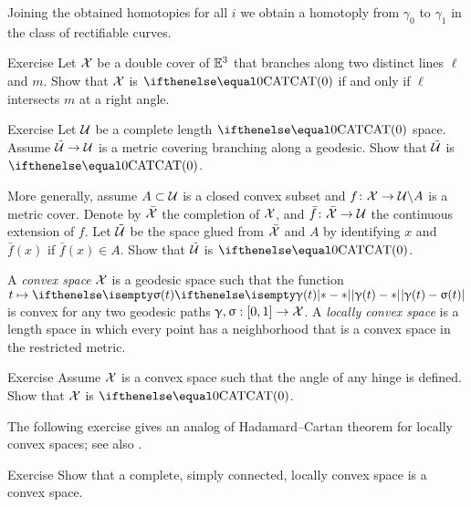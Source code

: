 Joining the obtained homotopies for all $i$ we obtain a homotoply from $\gamma_0$ to $\gamma_1$ in the class of rectifiable curves.
\qeds

\begin{thm}{Exercise}\label{ex:cover-branching-along-2-lines}
Let $\mathcal{X}$ be a double cover of $\mathbb{E}^3$ that branches along two distinct lines $\ell$ and $m$.
Show that  $\mathcal{X}$ is $\CAT0$ if and only if $\ell$ intersects $m$ at a right angle.
\end{thm}

\begin{thm}{Exercise}\label{ex:branching}
Let $\mathcal{U}$ be a complete length $\CAT0$ space.
Assume $\tilde{\spc{U}}\to \spc{U}$ is a metric covering branching along a geodesic.
Show that $\tilde{\mathcal{U}}$ is $\CAT0$.

More generally, assume $A\subset \spc{U}$ is a closed convex subset and $f\:\spc{X}\to \spc{U}\backslash A$ is a metric cover.
Denote by $\bar{\mathcal{X}}$ the completion of $\mathcal{X}$, and 
$\bar f\:\bar{\spc{X}}\to \spc{U}$ the continuous extension of $f$.
Let $\tilde{\mathcal{U}}$ be the space glued from $\bar{\mathcal{X}}$ and $A$ by identifying $x$ and $\bar f(x)$ if $\bar f(x)\in A$.
Show that $\tilde{\mathcal{U}}$ is $\CAT0$.
\end{thm}

A \emph{convex space} $\mathcal{X}$ is a geodesic space such that the function
$t\mapsto\dist{\gamma(t)}{\sigma(t)}{}$ is convex 
for any two  geodesic paths $\gamma,\sigma:[0,1]\to \spc{X}$.  
A \emph{locally convex space} is a length space in which every point has a neighborhood that is a convex space in the restricted metric.


\begin{thm}{Exercise}\label{ex:cats-cradle}
Assume $\mathcal{X}$ is a convex space 
such that the angle of any hinge is defined.
Show that $\mathcal{X}$ is $\CAT{0}$.
\end{thm}

The following exercise gives an analog of Hadamard--Cartan theorem for locally convex spaces;
see also \cite{alexander-bishop:h-c}.

\begin{thm}{Exercise}\label{ex:Hadamard--Cartan}
Show that a complete, simply connected, locally convex space is a convex space.
\end{thm}





